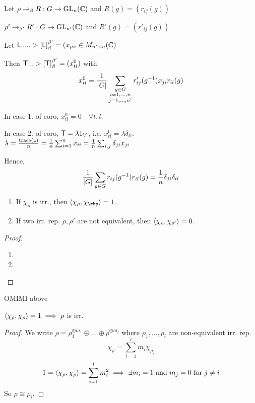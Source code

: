 \begin{remark}
  Let $\rho \to_\beta R: G \to \text{GL}_n(\mathbb{C})$ and $R(g) = (r_{ij}(g))$

  $\rho' \to_{\beta'} R': G \to \text{GL}_{n'}(\mathbb{C})$ and $R'(g) = (r'_{ij}(g))$

  Let ${\sf L} .....> [{\sf L}]^{\beta'}_\beta =
  (x_{\mu\nu} \in M_{n' \times n}(\mathbb{C})$

  Then ${\sf T} ...> [{\sf T}]^{\beta'}_\beta = (x^0_{tl})$ with
  \[
    x^0_{tl} = \frac{1}{\lvert G\rvert}
    \sum_{\substack{g\in G \\ i=1,\dots, n \\ j=1,\dots, n'}}
    r'_{tj}(g^{-1})x_{ji}r_{il}(g)
  \]

  In case 1. of coro, $x^0_{tl} = 0 \quad \forall t, l$.


  In case 2. of coro, ${\sf T} = \lambda 1_V$, i.e.
  $x^0_{tl} = \lambda \delta_{tl}$.
  $\lambda = \frac{\operatorname{trace}({\sf L})}{n} = \frac{1}{n} \sum_{i=1}^n x_{ii}
  = \frac{1}{n} \sum_{i,j} \delta_{ji}x_{ji}$

  Hence,
  \[
    \frac{1}{\lvert G\rvert} \sum_{g\in G}
    r_{tj}(g^{-1})r_{il}(g) = \frac{1}{n} \delta_{ji}\delta_{tl}
  \]
\end{remark}

\begin{prop} \mbox{}
  \begin{enumerate}
    \item If $\chi_\rho$ is irr., then $\inpd{\chi_\rho, \chi_\rhp} = 1$.
    \item If two irr. rep. $\rho, \rho'$ are not equivalent, then
      $\langle\chi_\rho, \chi_{\rho'}\rangle = 0$.
  \end{enumerate}

  \begin{proof}
    \begin{enumerate}
      \item
      \item 
    \end{enumerate}
  \end{proof}
\end{prop}

OMIMI above


\begin{remark}
  $\langle\chi_\rho,\chi_\rho\rangle = 1 \implies \rho$ is irr.
  \begin{proof}
    We write $\rho = \rho_1^{\oplus m_1}\oplus\dots\oplus\rho^{\oplus m_l}$
    where $\rho_1, \dots, \rho_l$ are non-equivalent irr. rep.
    \[ \chi_\rho = \sum_{i=1}^l m_i \chi_{\rho_i} \]
    \[
      1 = \langle\chi_\rho, \chi_\rho\rangle = \sum_{i=1}^l m_i^2
      \implies \exists m_i = 1 \text{~and~} m_j = 0 \text{~for~} j \ne i
    \]
    So $\rho \cong \rho_i$.
  \end{proof}
\end{remark}
